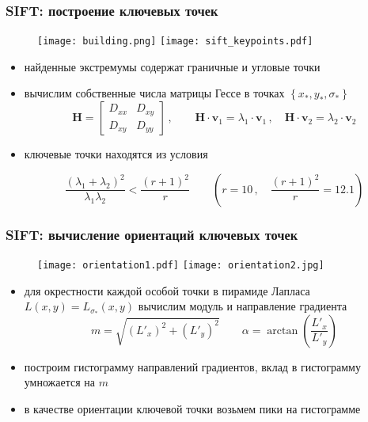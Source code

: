 \documentclass[12pt, usepdftitle=false, aspectratio=1610]{beamer}
\begin{document}
\begin{frame}
\frametitle{SIFT: построение ключевых точек}
\begin{figure}
    \texttt{[image: building.png]}
    \hspace{1cm}
    \texttt{[image: sift\_keypoints.pdf]}
\end{figure}
\begin{itemize}
    \item найденные экстремумы содержат граничные и угловые точки
    \item вычислим собственные  числа матрицы Гессе в точках $\left\{x_\ast,y_\ast,\sigma_\ast\right\}$
    $$
        \mathbf{H}=
        \begin{bmatrix}
        D_{xx} & D_{xy} \\
        D_{xy} & D_{yy}
        \end{bmatrix}\,,
        \qquad
        \mathbf{H}\cdot\mathbf{v}_1=\lambda_1\cdot\mathbf{v}_1\,,
        \quad
        \mathbf{H}\cdot\mathbf{v}_2=\lambda_2\cdot\mathbf{v}_2
    $$
    \item ключевые точки находятся из условия 

  $$
    \frac{(\lambda_1+\lambda_2)^2}{\lambda_1\lambda_2} < 
    \frac{(r+1)^2}{r}
    \qquad
    \left(r = 10\,,\quad \frac{(r+1)^2}{r}=12.1\right)
  $$
\end{itemize}
\end{frame}

\begin{frame}
\frametitle{SIFT: вычисление ориентаций ключевых точек}
\begin{figure}
    \texttt{[image: orientation1.pdf]}
    \hspace*{1cm}
    \texttt{[image: orientation2.jpg]}
\end{figure}
\begin{itemize}
    \item для окрестности каждой особой точки в пирамиде Лапласа $L(x,y)=L_{\sigma_\ast}(x,y)$
    вычислим  модуль и направление градиента
    $$
        m=\sqrt{(L'_x)^2+(L'_y)^2}\qquad
        \alpha=\arctan\left(\frac{L'_x}{L'_y}\right)
    $$
    \item построим гистограмму направлений градиентов, вклад в гистограмму умножается
    на $m$
    \item в качестве ориентации ключевой точки возьмем пики на гистограмме
\end{itemize}
\end{frame}
\end{document}
